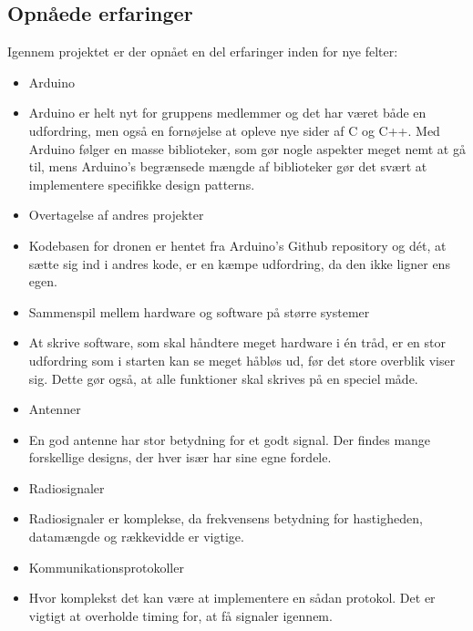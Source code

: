 \documentclass[Main]{subfiles}
\begin{document}
\subsection{Opnåede erfaringer}

Igennem projektet er der opnået en del erfaringer inden for nye felter:
\vspace{-20pt}
\begin{itemize}
\item Arduino
\vspace{-10pt}
\item[] Arduino er helt nyt for gruppens medlemmer og det har været både en udfordring, men også en fornøjelse at opleve nye sider af C og C++.
Med Arduino følger en masse biblioteker, som gør nogle aspekter meget nemt at gå til, mens Arduino's begrænsede mængde af biblioteker gør det svært at implementere specifikke design patterns.

\item Overtagelse af andres projekter
\vspace{-10pt}
\item[] Kodebasen for dronen er hentet fra Arduino's Github repository og dét, at sætte sig ind i andres kode, er en kæmpe udfordring, da den ikke ligner ens egen.


\item Sammenspil mellem hardware og software på større systemer
\vspace{-10pt}
\item[] At skrive software, som skal håndtere meget hardware i én tråd, er en stor udfordring som i starten kan se meget håbløs ud, før det store overblik viser sig.
Dette gør også, at alle funktioner skal skrives på en speciel måde.

\item Antenner
\vspace{-10pt}
\item[] En god antenne har stor betydning for et godt signal. 
Der findes mange forskellige designs, der hver især har sine egne fordele.

\item Radiosignaler
\vspace{-10pt}
\item[] Radiosignaler er komplekse, da frekvensens betydning for hastigheden, datamængde og rækkevidde er vigtige.

\item Kommunikationsprotokoller
\vspace{-10pt}
\item[] Hvor komplekst det kan være at implementere en sådan protokol. Det er vigtigt at overholde timing for, at få signaler igennem. 

\end{itemize}
\end{document}
